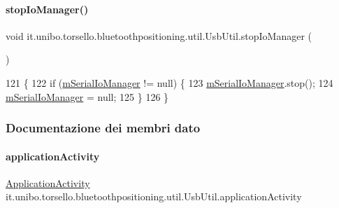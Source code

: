 \paragraph{\texorpdfstring{stop\+Io\+Manager()}{stopIoManager()}}
{\footnotesize\ttfamily void it.\+unibo.\+torsello.\+bluetoothpositioning.\+util.\+Usb\+Util.\+stop\+Io\+Manager (\begin{DoxyParamCaption}{ }\end{DoxyParamCaption})\hspace{0.3cm}{\ttfamily [private]}}


\begin{DoxyCode}
121                                  \{
122         \textcolor{keywordflow}{if} (\hyperlink{classit_1_1unibo_1_1torsello_1_1bluetoothpositioning_1_1util_1_1UsbUtil_aba070ed30c34ed6fd900b30452817b4b_aba070ed30c34ed6fd900b30452817b4b}{mSerialIoManager} != null) \{
123             \hyperlink{classit_1_1unibo_1_1torsello_1_1bluetoothpositioning_1_1util_1_1UsbUtil_aba070ed30c34ed6fd900b30452817b4b_aba070ed30c34ed6fd900b30452817b4b}{mSerialIoManager}.stop();
124             \hyperlink{classit_1_1unibo_1_1torsello_1_1bluetoothpositioning_1_1util_1_1UsbUtil_aba070ed30c34ed6fd900b30452817b4b_aba070ed30c34ed6fd900b30452817b4b}{mSerialIoManager} = null;
125         \}
126     \}
\end{DoxyCode}


\subsubsection{Documentazione dei membri dato}
\hypertarget{classit_1_1unibo_1_1torsello_1_1bluetoothpositioning_1_1util_1_1UsbUtil_afdcd78c04f043fafe29eb2cc006b5843_afdcd78c04f043fafe29eb2cc006b5843}{}\label{classit_1_1unibo_1_1torsello_1_1bluetoothpositioning_1_1util_1_1UsbUtil_afdcd78c04f043fafe29eb2cc006b5843_afdcd78c04f043fafe29eb2cc006b5843} 
\paragraph{\texorpdfstring{application\+Activity}{applicationActivity}}
{\footnotesize\ttfamily \hyperlink{classit_1_1unibo_1_1torsello_1_1bluetoothpositioning_1_1activities_1_1ApplicationActivity}{Application\+Activity} it.\+unibo.\+torsello.\+bluetoothpositioning.\+util.\+Usb\+Util.\+application\+Activity\hspace{0.3cm}{\ttfamily [private]}}


